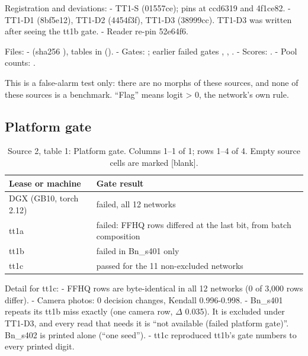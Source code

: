 \documentclass[10pt,twocolumn,letterpaper]{article}
\begin{document}
Registration and deviations: - TT1-S \protect{} (01557ce); pins at ccd6319 and 4f1ce82. - TT1-D1 (8bf5e12), TT1-D2 (4454f3f), TT1-D3 (38999cc). TT1-D3 was written after seeing the tt1b gate. - Reader re-pin 52e64f6.

Files: - \protect{} (sha256 \protect{}), tables in \protect{} (\protect{}). - Gates: \protect{}; earlier failed gates \protect{}, \protect{}, \protect{}. - Scores: \protect{}. - Pool counts: \protect{}.

This is a false-alarm test only: there are no morphs of these sources, and none of these sources is a benchmark. ``Flag'' means logit \textgreater{} 0, the network's own rule.

\subsection{Platform gate}\label{platform-gate}

\begin{table}[p]
\centering\small
\caption{Source 2, table 1: Platform gate. Columns 1--1 of 1; rows 1--4 of 4. Empty source cells are marked {[}blank{]}.}
\label{tab:transfer-2.1.1.0}
\begin{tabularx}{\textwidth}{>{\raggedright\arraybackslash}p{}>{\raggedright\arraybackslash}X}
\toprule
Lease or machine & Gate result \\
\midrule
DGX (GB10, torch 2.12) & failed, all 12 networks \\
tt1a & failed: FFHQ rows differed at the last bit, from batch composition \\
tt1b & failed in Bn\_s401 only \\
tt1c & passed for the 11 non-excluded networks \\
\bottomrule
\end{tabularx}
\end{table}


Detail for tt1c: - FFHQ rows are byte-identical in all 12 networks (0 of 3,000 rows differ). - Camera photos: 0 decision changes, Kendall 0.996-0.998. - Bn\_s401 repeats its tt1b miss exactly (one camera row, \textbar{}\(\Delta\)\textbar{} 0.035). It is excluded under TT1-D3, and every read that needs it is ``not available (failed platform gate)''. Bn\_s402 is printed alone (``one seed''). - tt1c reproduced tt1b's gate numbers to every printed digit.
\end{document}
